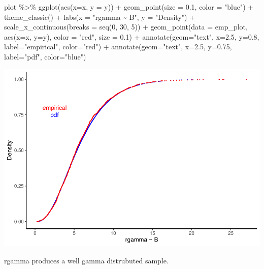 \documentclass[
  10pt,
]{article}
\newenvironment{Shaded}{\begin{snugshade}}{\end{snugshade}}
\newcommand{\AttributeTok}[1]{\textcolor[rgb]{0.77,0.63,0.00}{#1}}
\newcommand{\DecValTok}[1]{\textcolor[rgb]{0.00,0.00,0.81}{#1}}
\newcommand{\FloatTok}[1]{\textcolor[rgb]{0.00,0.00,0.81}{#1}}
\newcommand{\FunctionTok}[1]{\textcolor[rgb]{0.00,0.00,0.00}{#1}}
\newcommand{\NormalTok}[1]{#1}
\newcommand{\SpecialCharTok}[1]{\textcolor[rgb]{0.00,0.00,0.00}{#1}}
\newcommand{\StringTok}[1]{\textcolor[rgb]{0.31,0.60,0.02}{#1}}
\begin{document}
\begin{Shaded}
\begin{Highlighting}[]
\NormalTok{plot }\SpecialCharTok{\%\textgreater{}\%}
  \FunctionTok{ggplot}\NormalTok{(}\FunctionTok{aes}\NormalTok{(}\AttributeTok{x=}\NormalTok{x, }\AttributeTok{y =}\NormalTok{ y)) }\SpecialCharTok{+}
  \FunctionTok{geom\_point}\NormalTok{(}\AttributeTok{size =} \FloatTok{0.1}\NormalTok{,}
             \AttributeTok{color =} \StringTok{"blue"}\NormalTok{) }\SpecialCharTok{+}
  \FunctionTok{theme\_classic}\NormalTok{() }\SpecialCharTok{+}
  \FunctionTok{labs}\NormalTok{(}\AttributeTok{x =} \StringTok{"rgamma \textasciitilde{} B"}\NormalTok{,}
       \AttributeTok{y =} \StringTok{"Density"}\NormalTok{) }\SpecialCharTok{+}
  \FunctionTok{scale\_x\_continuous}\NormalTok{(}\AttributeTok{breaks =} \FunctionTok{seq}\NormalTok{(}\DecValTok{0}\NormalTok{, }\DecValTok{30}\NormalTok{, }\DecValTok{5}\NormalTok{)) }\SpecialCharTok{+}
  \FunctionTok{geom\_point}\NormalTok{(}\AttributeTok{data =}\NormalTok{ emp\_plot,}
             \FunctionTok{aes}\NormalTok{(}\AttributeTok{x=}\NormalTok{x,}
                 \AttributeTok{y=}\NormalTok{y),}
             \AttributeTok{color =} \StringTok{"red"}\NormalTok{,}
             \AttributeTok{size =} \FloatTok{0.1}\NormalTok{) }\SpecialCharTok{+}
  \FunctionTok{annotate}\NormalTok{(}\AttributeTok{geom=}\StringTok{"text"}\NormalTok{, }\AttributeTok{x=}\FloatTok{2.5}\NormalTok{, }\AttributeTok{y=}\FloatTok{0.8}\NormalTok{, }\AttributeTok{label=}\StringTok{"empirical"}\NormalTok{, }\AttributeTok{color=}\StringTok{"red"}\NormalTok{) }\SpecialCharTok{+}
  \FunctionTok{annotate}\NormalTok{(}\AttributeTok{geom=}\StringTok{"text"}\NormalTok{, }\AttributeTok{x=}\FloatTok{2.5}\NormalTok{, }\AttributeTok{y=}\FloatTok{0.75}\NormalTok{, }\AttributeTok{label=}\StringTok{"pdf"}\NormalTok{, }\AttributeTok{color=}\StringTok{"blue"}\NormalTok{)}
\end{Highlighting}
\end{Shaded}

\includegraphics{Heimaverkefni-1_files/figure-latex/unnamed-chunk-10-1.pdf}

rgamma produces a well gamma distrubuted sample.
\end{document}
